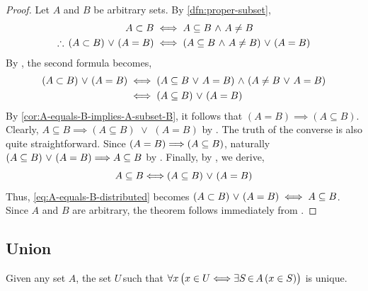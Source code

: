 \begin{proof}
    Let \( A \) and \( B \) be arbitrary sets. By \cref{dfn:proper-subset},
    \begin{align*}
        A \subset B &\iff A \subseteq B \,\,{\land}\,\, A \neq B\\
        \therefore \, (A \subset B) \,\,{\lor}\,\, (A = B) &\iff \mleft( A \subseteq B \,\,{\land}\,\, A \neq B \mright) \,\,{\lor}\,\, (A = B)
    \end{align*}
    By , the second formula becomes,
    \begin{align}
        \mleft( A \subset B \mright) \,\,{\lor}\,\, \mleft( A = B \mright) &\iff \mleft( A \subseteq B \,\,{\lor}\,\, A = B \mright)
        \,\,{\land}\,\,
        \mleft( A \neq B \,\,{\lor}\,\, A = B \mright) \notag \\
        &\iff \mleft( A \subseteq B \mright) \,\,{\lor}\,\, \mleft( A = B \mright) \label{eq:A-equals-B-distributed}
    \end{align}
    By \cref{cor:A-equals-B-implies-A-subset-B}, it follows that \( (A = B) {\implies} (A \subseteq B) \).
    Clearly, \( A \subseteq B {\implies} (A \subseteq B) \,\,{\lor}\,\, (A = B) \) by .
    The truth of the converse is also quite straightforward. Since \( \mleft( A = B \mright) {\implies} \mleft( A \subseteq B \mright) \), naturally
    \( \mleft( A \subseteq B \mright) \,\,{\lor}\,\, \mleft( A = B \mright) {\implies} A \subseteq B \)
    by .
    Finally, by , we derive,
    \begin{equation*}
        A \subseteq B {\iff} \mleft( A \subseteq B \mright) \,\,{\lor}\,\, \mleft( A = B \mright)
    \end{equation*}
    Thus, \eqref{eq:A-equals-B-distributed} becomes \( \mleft( A \subset B \mright) \,\,{\lor}\,\, \mleft( A = B \mright) \iff A \subseteq B \). Since
    \( A \) and \( B \) are arbitrary, the theorem follows immediately from .
\end{proof}

\subsection{Union}
\begin{thm}
    \label{thm:uniqueness-union}
    Given any set \( A \), the set \( U \)\,such that \( \forall x \, \big( x \in U {\iff} \exists S \, {\in} \, A \, \mleft( x \in S \mright) \big) \)
    is unique.
\end{thm}

